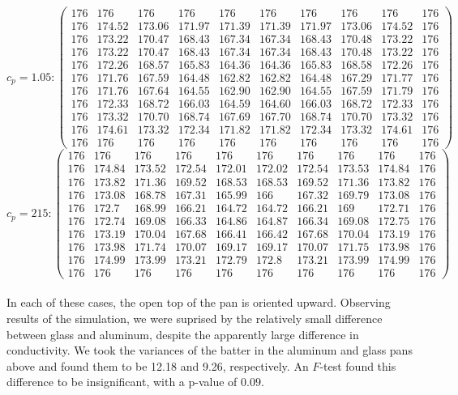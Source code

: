 \documentclass[12pt]{reedmcm}
\begin{document}
\[c_p = 1.05: \begin{pmatrix} 176&176&176&176&176&176&176&176&176&176\\
176&174.52&173.06&171.97&171.39&171.39&171.97&173.06&174.52&176\\
176&173.22&170.47&168.43&167.34&167.34&168.43&170.48&173.22&176\\
176&173.22&170.47&168.43&167.34&167.34&168.43&170.48&173.22&176\\
176&172.26&168.57&165.83&164.36&164.36&165.83&168.58&172.26&176\\
176&171.76&167.59&164.48&162.82&162.82&164.48&167.29&171.77&176\\
176&171.76&167.64&164.55&162.90&162.90&164.55&167.59&171.79&176\\
176&172.33&168.72&166.03&164.59&164.60&166.03&168.72&172.33&176\\
176&173.32&170.70&168.74&167.69&167.70&168.74&170.70&173.32&176\\
176&174.61&173.32&172.34&171.82&171.82&172.34&173.32&174.61&176\\
176&176&176&176&176&176&176&176&176&176\end{pmatrix}\]
\[c_p = 215: \begin{pmatrix} 176&176&176&176&176&176&176&176&176&176\\
176&174.84&173.52&172.54&172.01&172.02&172.54&173.53&174.84&176\\
176&173.82&171.36&169.52&168.53&168.53&169.52&171.36&173.82&176\\
176&173.08&168.78&167.31&165.99&166&167.32&169.79&173.08&176\\
176&172.7&168.99&166.21&164.72&164.72&166.21&169&172.71&176\\
176&172.74&169.08&166.33&164.86&164.87&166.34&169.08&172.75&176\\
176&173.19&170.04&167.68&166.41&166.42&167.68&170.04&173.19&176\\
176&173.98&171.74&170.07&169.17&169.17&170.07&171.75&173.98&176\\
176&174.99&173.99&173.21&172.79&172.8&173.21&173.99&174.99&176\\
176&176&176&176&176&176&176&176&176&176 \end{pmatrix}\]
\\
In each of these cases, the open top of the pan is oriented upward.  Observing results of the simulation, we were suprised by the relatively small difference between glass and aluminum, despite the apparently large difference in conductivity.  We took the variances of the batter in the aluminum and glass pans above and found them to be 12.18 and 9.26, respectively.  An $F$-test found this difference to be insignificant, with a p-value of $0.09$.
\end{document}
